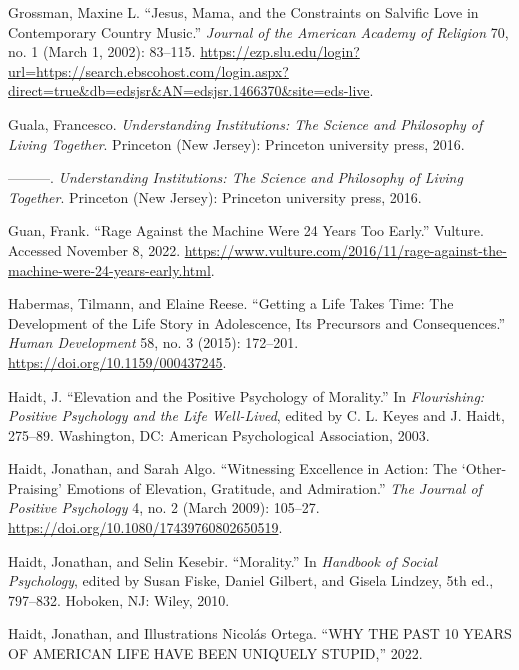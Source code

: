 \documentclass[phdthesis,12pt,final]{wuthesis}
\newlength{\cslhangindent}
\newenvironment{CSLReferences}[2] %
{\begin{list}{}{%
	\setlength{\itemindent}{0pt}
	\setlength{\leftmargin}{0pt}
	\setlength{\parsep}{0pt}
	\ifodd #1
	\setlength{\leftmargin}{\cslhangindent}
	\setlength{\itemindent}{-1\cslhangindent}
	\fi
	\setlength{\itemsep}{#2\baselineskip}}}
{\end{list}}
\theoremstyle{definition}
\theoremstyle{definition}
\theoremstyle{definition}
\theoremstyle{definition}
\theoremstyle{remark}
\begin{document}
\begin{CSLReferences}{1}{0}
Grossman, Maxine L. {``Jesus, {Mama}, and the {Constraints} on {Salvific Love} in {Contemporary Country Music}.''} \emph{Journal of the American Academy of Religion} 70, no. 1 (March 1, 2002): 83--115. \url{https://ezp.slu.edu/login?url=https://search.ebscohost.com/login.aspx?direct=true&db=edsjsr&AN=edsjsr.1466370&site=eds-live}.

Guala, Francesco. \emph{Understanding Institutions: The Science and Philosophy of Living Together}. Princeton (New Jersey): Princeton university press, 2016.

---------. \emph{Understanding {Institutions}: {The Science} and {Philosophy} of {Living Together}}. Princeton (New Jersey): Princeton university press, 2016.

Guan, Frank. {``Rage Against the Machine Were 24 Years Too Early.''} Vulture. Accessed November 8, 2022. \url{https://www.vulture.com/2016/11/rage-against-the-machine-were-24-years-early.html}.

Habermas, Tilmann, and Elaine Reese. {``Getting a Life Takes Time: The Development of the Life Story in Adolescence, Its Precursors and Consequences.''} \emph{Human Development} 58, no. 3 (2015): 172--201. \url{https://doi.org/10.1159/000437245}.

Haidt, J. {``Elevation and the Positive Psychology of Morality.''} In \emph{Flourishing: {Positive} Psychology and the Life Well-Lived}, edited by C. L. Keyes and J. Haidt, 275--89. Washington, DC: American Psychological Association, 2003.

Haidt, Jonathan, and Sarah Algo. {``Witnessing {Excellence} in {Action}: {The} {`{Other-Praising}'} {Emotions} of {Elevation}, {Gratitude}, and {Admiration}.''} \emph{The Journal of Positive Psychology} 4, no. 2 (March 2009): 105--27. \url{https://doi.org/10.1080/17439760802650519}.

Haidt, Jonathan, and Selin Kesebir. {``Morality.''} In \emph{Handbook of Social Psychology}, edited by Susan Fiske, Daniel Gilbert, and Gisela Lindzey, 5th ed., 797--832. Hoboken, NJ: Wiley, 2010.

Haidt, Jonathan, and Illustrations Nicolás Ortega. {``{WHY THE PAST} 10 {YEARS OF AMERICAN LIFE HAVE BEEN UNIQUELY STUPID},''} 2022.


\end{CSLReferences}
\end{document}
